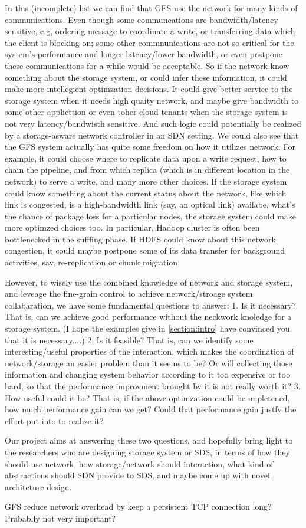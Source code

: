 In this (incomplete) list we can find that GFS use the network for many kinds of communications. Even though some communcations are bandwidth/latency sensitive, e.g, ordering message to coordinate a write, or transferring data which the client is blocking on; some other commnunications are not so critical for the system's performance and longer latency/lower bandwidth, or even postpone these communications for a while would be acceptable. So if the network know something about the storage system, or could infer these information, it could make more intellegient optimzation decisions. It could give better service to the storage system when it needs high quaity network, and maybe give bandwidth to some other applicttion or even toher cloud tenants when the storage system is not very latency/bandwisth sensitive.  And such logic could potentially be realized by a storage-asware network controller in an SDN setting. We could also see that the GFS system actually has quite some freedom on how it utilizes network. For example, it could choose where to replicate data upon a write request, how to chain the pipeline, and from which replica (which is in different location in the network) to serve a write, and many more other choices. If the storage system could know something about the current status about the network, like which link is congested, is a high-bandwidth link (say, an optical link) availabe, what's the chance of package loss for a particular nodes, the storage system could make more optimzed choices too. In particular, Hadoop cluster is often been bottlenecked in the suffling phase. If HDFS could know about this network congestion, it could maybe postpone some of its data transfer for background activities, say, re-replication or chunk migration.

However, to wisely use the combined knowledge of network and storage system, and leveage the fine-grain control to achieve network/stroage system collabaration, we have some fundamental questions to answer:
1. Is it necessary? That is, can we achieve good performance without the neckwork knoledge for a storage system. (I hope the examples give in \ref{section:intro} have convinced you that it is necessary....)
2. Is it feasible? That is, can we identify some interesting/useful properties of the interaction, which makes the coordination of network/storage an easier problem than it seems to be? Or will collecting those information and changing system behavior according to it too expensive or too hard, so that the performance improvment brought by it is not really worth it?
3. How useful could it be? That is, if the above optimzation could be impletened, how much performance gain can we get? Could that performance gain justfy the effort put into to realize it?

Our project aims at answering these two questions, and hopefully bring light to the researchers who are designing storage system or SDS, in terms of how they should use network, how storage/network should interaction, what kind of abstractions should SDN provide to SDS, and maybe come up with novel architeture design.




GFS reduce network overhead by keep a persistent TCP connection long? Prabablly not very important?
